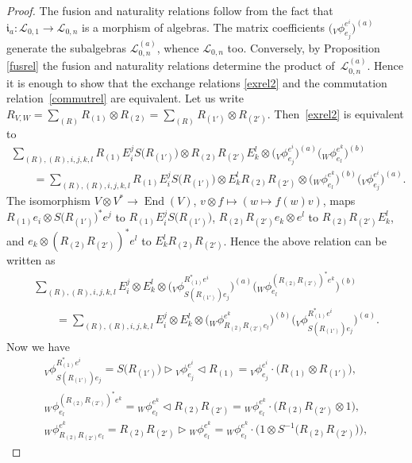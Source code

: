 \documentclass[pdftex]{sigma}%
\numberwithin{equation}{section}
\numberwithin{figure}{section}
\newcommand{\Ll}{{\mathcal L}}
\newcommand{\ra}{\rightarrow}
\begin{document}
\begin{proof} The fusion and naturality relations follow from the fact that $\mathfrak{i}_a\colon \Ll_{0,1}\ra \Ll_{0,n}$ is a morphism of algebras. The matrix coefficients $\big({}_V\phi^{e^i}_{e_j}\big)^{(a)}$ generate the subalgebras $\Ll_{0,n}^{(a)}$, whence $\Ll_{0,n}$ too. Conversely, by Proposition \ref{fusrel} the fusion and naturality relations determine the product of~$\Ll_{0,n}^{(a)}$. Hence it is enough to show that the exchange relations \eqref{exrel2} and the commutation relation~\eqref{commutrel} are equivalent. Let us write $\textstyle R_{V,W}=\sum_{(R)}R_{(1) }\otimes R_{(2)}=\sum_{(R)}R_{(1') }\otimes R_{(2')}$. Then~\eqref{exrel2} is equivalent to
\begin{gather*}
\sum_{(R),(R), i,j,k,l} R_{(1)}E_i^j S\big(R_{(1')}\big) \otimes R_{(2)}R_{(2')}E_k^l \otimes \big({}_V\phi^{e^i}_{e_j}\big)^{(a)} \big({}_W\phi^{e^k}_{e_l}\big)^{(b)}
\\ \qquad
{}= \sum_{(R),(R),i,j,k,l} R_{(1)}E_i^j S\big(R_{(1')}\big) \otimes E_k^l R_{(2)}R_{(2')} \otimes \big({}_W\phi^{e^k}_{e_l}\big)^{(b)}\big({}_V\phi^{e^i}_{e_j}\big)^{(a)}.
\end{gather*}
The isomorphism $V \otimes V^* \rightarrow \operatorname{End}(V)$, $v\otimes f\mapsto (w\mapsto f(w)v)$, maps $R_{(1)}e_i \otimes S\big(R_{(1')}\big)^*e^j$ to $R_{(1)}E_i^j S\big(R_{(1')}\big)$, $R_{(2)}R_{(2')}e_k \otimes e^l$ to $R_{(2)}R_{(2')}E_k^l$, and $e_k \otimes (R_{(2)}R_{(2')})^*e^l$ to $E_k^lR_{(2)}R_{(2')}$. Hence the above relation can be written as
\begin{gather*}
\sum_{(R),(R), i,j,k,l} E_i^j \otimes E_k^l \otimes \Big({}_V\phi^{R_{(1)} ^*e^i}_{ S(R_{(1')})e_j}\Big)^{(a)} \Big({}_W\phi^{(R_{(2)}R_{(2')})^*e^k}_{e_l}\Big)^{(b)}
\\ \qquad
{}= \sum_{(R),(R),i,j,k,l} E_i^j\otimes E_k^l \otimes \big({}_W\phi^{e^k}_{R_{(2)}R_{(2')}e_l}\big)^{(b)}\Big({}_V\phi^{R_{(1)} ^*e^i}_{ S(R_{(1')})e_j}\Big)^{(a)}.
\end{gather*}
Now we have
\begin{gather*}
 {}_V\phi^{R_{(1)} ^*e^i}_{S(R_{(1')})e_j} = S\big(R_{(1')}\big) \rhd {}_V\phi^{e^i}_{e_j} \lhd R_{(1)} = {}_V\phi^{e^i}_{e_j} \cdot \big(R_{(1)}\otimes R_{(1')}\big),
\\
{}_W\phi^{(R_{(2)}R_{(2')})^*e^k}_{e_l} = {}_W\phi^{e^k}_{e_l} \lhd R_{(2)}R_{(2')} = {}_W\phi^{e^k}_{e_l} \cdot \big(R_{(2)}R_{(2')} \otimes 1\big),
\\
{}_W\phi^{e^k}_{R_{(2)}R_{(2')}e_l} = R_{(2)}R_{(2')}\rhd {}_W\phi^{e^k}_{e_l} = {}_W\phi^{e^k}_{e_l} \cdot \big(1 \otimes S^{-1}\big(R_{(2)}R_{(2')}\big)\big),

\end{gather*}
\end{proof}
\end{document}
